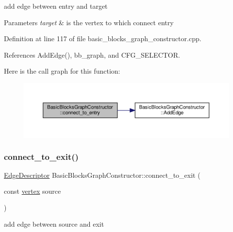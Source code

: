 add edge between entry and target 


\begin{DoxyParams}{Parameters}
{\em target} & is the vertex to which connect entry \\
\hline
\end{DoxyParams}


Definition at line 117 of file basic\+\_\+blocks\+\_\+graph\+\_\+constructor.\+cpp.



References Add\+Edge(), bb\+\_\+graph, and C\+F\+G\+\_\+\+S\+E\+L\+E\+C\+T\+OR.

Here is the call graph for this function\+:
\nopagebreak
\begin{figure}[H]
\begin{center}
\leavevmode
\includegraphics[width=350pt]{d6/d91/classBasicBlocksGraphConstructor_a953d6610d95301b93d33117d9cdc8f65_cgraph}
\end{center}
\end{figure}
\mbox{\label{classBasicBlocksGraphConstructor_ab3c2b2d78837ddceb07ce85913aa9eb2}} 
\subsubsection{\texorpdfstring{connect\+\_\+to\+\_\+exit()}{connect\_to\_exit()}}
{\footnotesize\ttfamily \hyperlink{graph_8hpp_a9eb9afea34e09f484b21f2efd263dd48}{Edge\+Descriptor} Basic\+Blocks\+Graph\+Constructor\+::connect\+\_\+to\+\_\+exit (\begin{DoxyParamCaption}\item[{const \hyperlink{graph_8hpp_abefdcf0544e601805af44eca032cca14}{vertex}}]{source }\end{DoxyParamCaption})}



add edge between source and exit 



